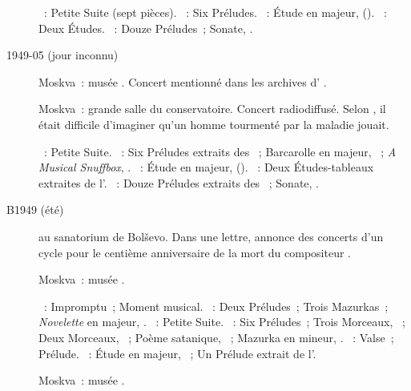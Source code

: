 \begin{description}
 \textsc{\Borodine{}}~: Petite Suite (sept pièces).
 \textsc{\Liadov{}}~: Six Préludes.
 \textsc{\Glazounov{}}~: Étude en \kE majeur,  
 ().
 \textsc{\Rachmaninov{}}~: Deux Études.
 \textsc{\Scriabine{}}~: Douze Préludes~; Sonate, .
 \item[1949-05 (jour inconnu)]
 Moskva~: musée \Scriabine{}.
 Concert mentionné dans les archives d'\AVizel{}
 \citep[voir][p.~169]{Nekrasova08}.
 \item[\DateWithWeekDay{1949-05-31}]
 Moskva~: grande salle du conservatoire.
 Concert radiodiffusé.
 Selon \citet[p.~170]{Nekrasova08}, il était difficile d'imaginer qu'un
 homme tourmenté par la maladie jouait.

 \textsc{\Borodine{}}~: Petite Suite.
 \textsc{\Liadov{}}~: Six Préludes extraits des ~;
 Barcarolle en \kF \Sharp majeur, ~; \emph{A Musical Snuffbox},
 .
 \textsc{\Glazounov{}}~: Étude en \kE majeur,  
 ().
 \textsc{\Rachmaninov{}}~: Deux Études-tableaux extraites de l'.
 \textsc{\Scriabine{}}~: Douze Préludes extraits des ~; Sonate, .
 \item[B1949 (été)]
 \VSofronitsky{} au sanatorium de Bolševo.
 Dans une lettre, annonce des concerts d'un cycle \Chopin{} pour le centième
 anniversaire de la mort du compositeur \citep[voir][p.~170]{Nekrasova08}.
 \item[\DateWithWeekDay{1949-09-09}]
 Moskva~: musée \Scriabine{}.

 \textsc{\Schubert{}}~: Impromptu~; Moment musical.
 \textsc{\Liadov{}}~: Deux Préludes~; Trois Mazurkas~; \emph{Novelette} en
 \kC majeur, .
 \textsc{\Borodine{}}~: Petite Suite.
 \textsc{\Scriabine{}}~: Six Préludes~; Trois Morceaux, ~; Deux
 Morceaux, ~; Poème satanique, ~; Mazurka en \kE mineur,
  .
 \textsc{\Liadov{}}~: Valse~; Prélude.
 \textsc{\Scriabine{}}~: Étude en \kD \Flat majeur,  ~;
 Un Prélude extrait de l'.
 \item[\DateWithWeekDay{1949-10-09}]
 Moskva~: musée \Scriabine{}.


\end{description}
